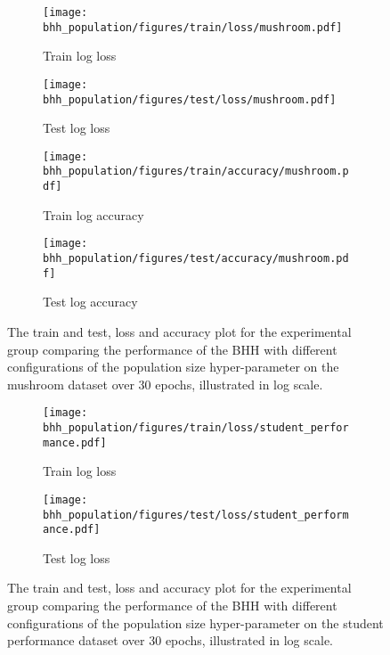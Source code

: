 \begin{figure}[htbp]
	\begin{subfigure}{0.5\textwidth}
		\centering
		\texttt{[image: bhh\_population/figures/train/loss/mushroom.pdf]}
		\caption{Train log loss}
		\label{fig:results:population:figures:loss:train:mushroom}
	\end{subfigure}
	\begin{subfigure}{0.5\textwidth}
		\centering
		\texttt{[image: bhh\_population/figures/test/loss/mushroom.pdf]}
		\caption{Test log loss}
		\label{fig:results:population:figures:loss:test:mushroom}
	\end{subfigure}
	\par\bigskip
	\begin{subfigure}{0.5\textwidth}
		\centering
		\texttt{[image: bhh\_population/figures/train/accuracy/mushroom.pdf]}
		\caption{Train log accuracy}
		\label{fig:results:population:figures:accuracy:train:mushroom}
	\end{subfigure}
	\begin{subfigure}{0.5\textwidth}
		\centering
		\texttt{[image: bhh\_population/figures/test/accuracy/mushroom.pdf]}
		\caption{Test log accuracy}
		\label{fig:results:population:figures:accuracy:test:mushroom}
	\end{subfigure}
	\par\bigskip
	\caption{The train and test, loss and accuracy plot for the experimental group comparing the performance of the \acs{BHH} with different configurations of the population size hyper-parameter on the mushroom dataset over 30 epochs, illustrated in log scale.}
	\label{fig:results:population:figures:mushroom}
\end{figure}



\begin{figure}[htbp]
	\begin{subfigure}{0.5\textwidth}
		\centering
		\texttt{[image: bhh\_population/figures/train/loss/student\_performance.pdf]}
		\caption{Train log loss}
		\label{fig:results:population:figures:loss:train:student_performance}
	\end{subfigure}
	\begin{subfigure}{0.5\textwidth}
		\centering
		\texttt{[image: bhh\_population/figures/test/loss/student\_performance.pdf]}
		\caption{Test log loss}
		\label{fig:results:population:figures:loss:test:student_performance}
	\end{subfigure}
	\par\bigskip
	\caption{The train and test, loss and accuracy plot for the experimental group comparing the performance of the \acs{BHH} with different configurations of the population size hyper-parameter on the student performance dataset over 30 epochs, illustrated in log scale.}
	\label{fig:results:population:figures:student_performance}
\end{figure}

